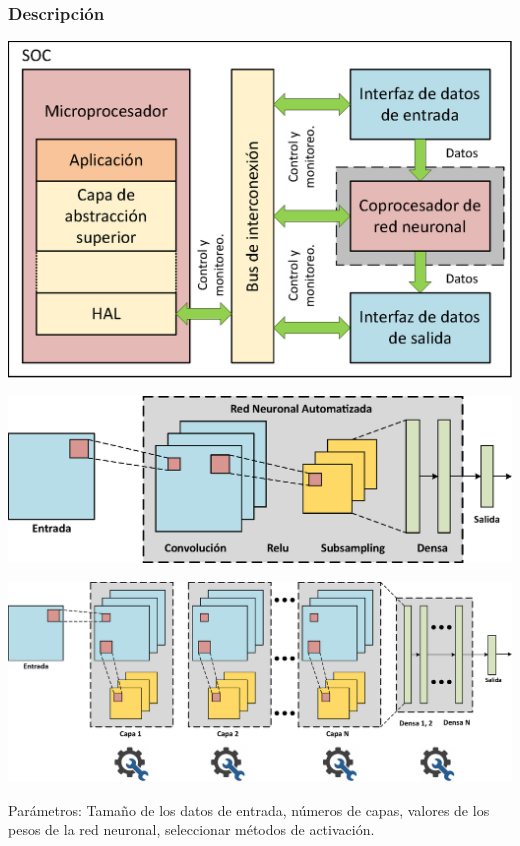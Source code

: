 \documentclass{beamer}
\begin{document}
\begin{frame}[allowframebreaks,c]

\frametitle{Descripción}

\centering

\includegraphics[scale=0.5]{Figuras/Diagramas}

\includegraphics[scale=0.55]{Figuras/RN1}

\includegraphics[scale=0.35]{Figuras/RN2}

\justifying

\vspace{0.5cm}

Parámetros: Tamaño de los datos de entrada, números de capas, valores de los pesos de la red neuronal, seleccionar métodos de activación.  

\end{frame}
\end{document}
